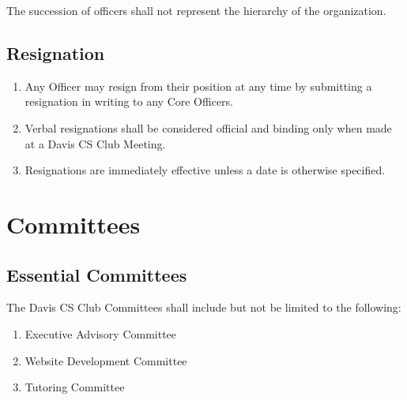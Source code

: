 \documentclass{article}
\newenvironment{li}{
\begin{enumerate}
  \setlength{\itemsep}{1pt}
  \setlength{\parskip}{0pt}
  \setlength{\parsep}{0pt}
}{\end{enumerate}}
\begin{document}
\noindent The succession of officers shall not represent the hierarchy of the organization.

\subsection{Resignation}
\begin{li}
\item Any Officer may resign from their position at any time by submitting a resignation in writing to any Core Officers.
\item Verbal resignations shall be considered official and binding only when made at a Davis CS Club Meeting.
\item Resignations are immediately effective unless a date is otherwise specified.
\end{li}


\section{Committees}
\subsection{Essential Committees}
The Davis CS Club Committees shall include but not be limited to the following:
\begin{li}
\item Executive Advisory Committee
\item Website Development Committee
\item Tutoring Committee
\end{li}
\end{document}
